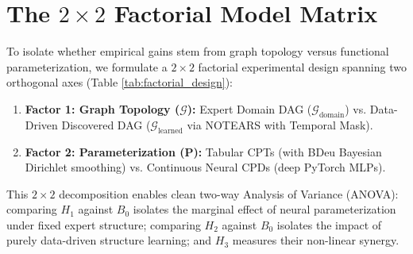 \section{The $2 \times 2$ Factorial Model Matrix}
\label{sec:meth_factorial_matrix}

To isolate whether empirical gains stem from graph topology versus functional parameterization, we formulate a $2 \times 2$ factorial experimental design spanning two orthogonal axes (Table \ref{tab:factorial_design}):
\begin{enumerate}
    \item \textbf{Factor 1: Graph Topology ($\mathcal{G}$):} Expert Domain DAG ($\mathcal{G}_{\text{domain}}$) vs. Data-Driven Discovered DAG ($\mathcal{G}_{\text{learned}}$ via NOTEARS with Temporal Mask).
    \item \textbf{Factor 2: Parameterization ($\mathbf{P}$):} Tabular CPTs (with BDeu Bayesian Dirichlet smoothing) vs. Continuous Neural CPDs (deep PyTorch MLPs).
\end{enumerate}

\begin{table}[htbp]
    \centering
    \small
    \caption{The $2 \times 2$ Factorial Model Architecture Space.}
    \label{tab:factorial_design}
\end{table}

This $2 \times 2$ decomposition enables clean two-way Analysis of Variance (ANOVA): comparing $H_1$ against $B_0$ isolates the marginal effect of neural parameterization under fixed expert structure; comparing $H_2$ against $B_0$ isolates the impact of purely data-driven structure learning; and $H_3$ measures their non-linear synergy.
